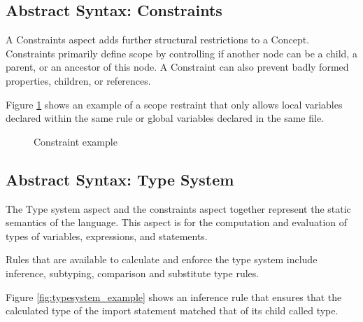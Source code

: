 \newpage
\subsection{Abstract Syntax: Constraints}
A Constraints aspect adds further structural restrictions to a Concept.
Constraints primarily define scope by controlling if another node can be a child, a parent, or an ancestor of this node.
A Constraint can also prevent badly formed properties, children, or references.

Figure \ref{fig:constraint_example} shows an example of a scope restraint that only allows local variables declared within the same rule or global variables declared in the same file.
 
\begin{figure}[h]
    \centering
    \caption{Constraint example}
    \label{fig:constraint_example}
\end{figure}

\subsection{Abstract Syntax: Type System}
The Type system aspect and the constraints aspect together represent the static semantics of the language.
This aspect is for the computation and evaluation of types of variables, expressions, and statements.

Rules that are available to calculate and enforce the type system include inference, subtyping, comparison and substitute type rules.

Figure \ref{fig:typesystem_example} shows an inference rule that ensures that the calculated type of the import statement matched that of its child called type.


